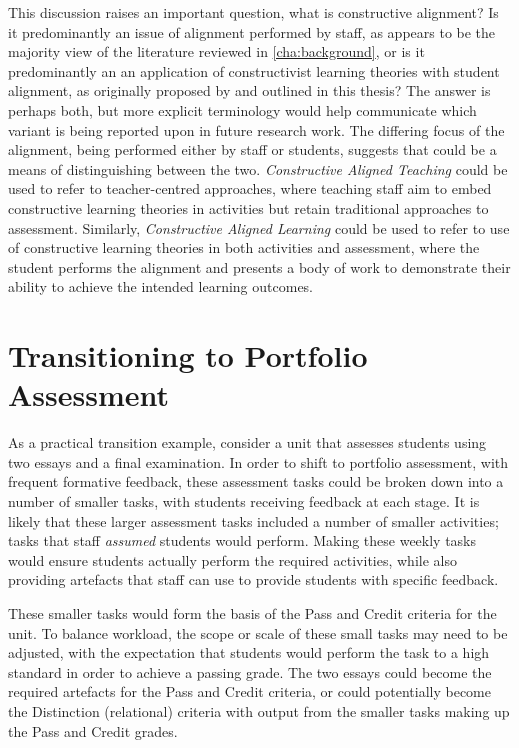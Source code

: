 This discussion raises an important question, what is constructive alignment? Is it predominantly an issue of alignment performed by staff, as appears to be the majority view of the literature reviewed in \cref{cha:background}, or is it predominantly an an application of constructivist learning theories with student alignment, as originally proposed by \citet{Biggs:1996c} and outlined in this thesis? The answer is perhaps both, but more explicit terminology would help communicate which variant is being reported upon in future research work. The differing focus of the alignment, being performed either by staff or students, suggests that could be a means of distinguishing between the two. \emph{Constructive Aligned Teaching} could be used to refer to teacher-centred approaches, where teaching staff aim to embed constructive learning theories in activities but retain traditional approaches to assessment. Similarly, \emph{Constructive Aligned Learning} could be used to refer to use of constructive learning theories in both activities and assessment, where the student performs the alignment and presents a body of work to demonstrate their ability to achieve the intended learning outcomes. 



\section{Transitioning to Portfolio Assessment} %
\label{sec:transitioning_to_portfolio_assessment}

As a practical transition example, consider a unit that assesses students using two essays and a final examination. In order to shift to portfolio assessment, with frequent formative feedback, these assessment tasks could be broken down into a number of smaller tasks, with students receiving feedback at each stage. It is likely that these larger assessment tasks included a number of smaller activities; tasks that staff \emph{assumed} students would perform. Making these weekly tasks would ensure students actually perform the required activities, while also providing artefacts that staff can use to provide students with specific feedback.

These smaller tasks would form the basis of the Pass and Credit criteria for the unit. To balance workload, the scope or scale of these small tasks may need to be adjusted, with the expectation that students would perform the task to a high standard in order to achieve a passing grade. The two essays could become the required artefacts for the Pass and Credit criteria, or could potentially become the Distinction (relational) criteria with output from the smaller tasks making up the Pass and Credit grades.

